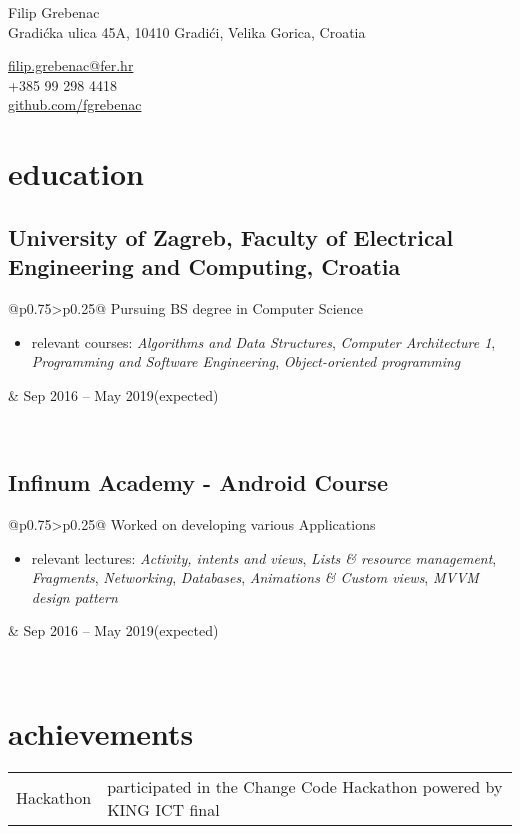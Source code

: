 \documentclass[a4paper]{article}
\makeatletter
\newlength{\tablewidth}
\newenvironment{period}[2]{%
\newcommand{\sarma}{#2}%
\setlength{\tablewidth}{\linewidth}
\addtolength{\tablewidth}{-2\tabcolsep}
\begin{tabular}{@{}p{0.75\tablewidth}>{\raggedleft\arraybackslash}p{0.25\tablewidth}@{}}%
#1 \newline
\begin{itemize}
}{%
\end{itemize} & \sarma \\%
\end{tabular}\\
}
\newenvironment{skills}{%
\setlength{\tablewidth}{\linewidth}
\addtolength{\tablewidth}{-2\tabcolsep}
\begin{tabular}{@{}p{0.15\tablewidth}p{0.85\tablewidth}@{}}
}{%
\end{tabular}
}
\makeatother
\begin{document}
\fontfamily{\sfdefault}
\selectfont

\begin{minipage}{.5\textwidth}
\LARGE{Filip Grebenac}\\
\normalsize{Gradićka ulica 45A, 10410 Gradići, Velika Gorica, Croatia}
\end{minipage}%
\begin{minipage}{.5\textwidth}
\raggedleft
\href{mailto:ime.prezime@gmail.com}{filip.grebenac@fer.hr} \\
+385 99 298 4418 \\
\href{https://github.com/iprezime}{github.com/fgrebenac}
\end{minipage}

\vspace{1em}


\section{education}
\subsection{University of Zagreb, Faculty of Electrical Engineering and Computing, Croatia}
\begin{period}{Pursuing BS degree in Computer Science}{Sep 2016 -- May 2019\linebreak(expected)}
    \item relevant courses:
        \textit{Algorithms and Data Structures},
        \textit{Computer Architecture 1},
        \textit{Programming and Software Engineering},
        \textit{Object-oriented programming}
\end{period}

\subsection{Infinum Academy - Android Course}
\begin{period}{Worked on developing various Applications}{Jul 2018 -- Aug 2018}
    \item relevant lectures:
        \textit{Activity, intents and views},
        \textit{Lists \& resource management},
        \textit{Fragments},
        \textit{Networking},
        \textit{Databases},
        \textit{Animations \& Custom views},
        \textit{MVVM design pattern}
\end{period}


\section{achievements}
\begin{skills}
    Hackathon   &   participated in the Change Code Hackathon powered by KING ICT final 
\end{skills}
\end{document}
